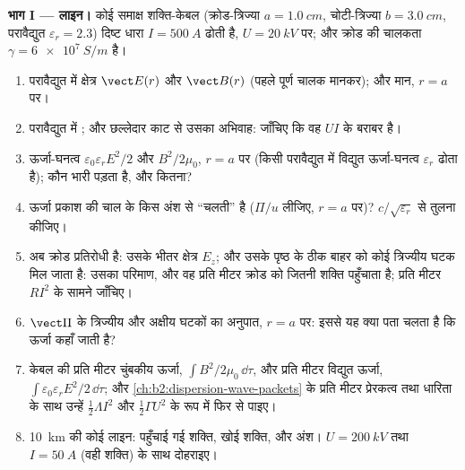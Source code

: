 \begin{problem}[{सप्ताहांत समस्या --- विद्युत्चुंबकीय ऊर्जा का पीछा:
किसी विद्युत-लाइन से किसी घर तक, सूर्य से किसी सौर पट्ट तक,
और किसी मैग्नेट्रॉन से पानी के किसी प्याले तक}]
\label{pb:b2:poynting-vector:1}

\medskip
\noindent\textbf{भाग I --- लाइन।}
कोई समाक्ष शक्ति-केबल (क्रोड-त्रिज्या $a = \qty{1.0}{cm}$, चोटी-त्रिज्या $b =
\qty{3.0}{cm}$, परावैद्युत $\varepsilon_r = 2.3$) दिष्ट धारा $I =
\qty{500}{A}$ ढोती है, $U = \qty{20}{kV}$ पर; और क्रोड की चालकता $\gamma =
\qty{6e7}{S/m}$ है।
\begin{enumerate}
  \item परावैद्युत में क्षेत्र $\vect E(r)$ और $\vect B(r)$ (पहले पूर्ण
        चालक मानकर); और मान, $r = a$ पर।
  \item परावैद्युत में ; और छल्लेदार काट से उसका अभिवाह:
        जाँचिए कि वह $UI$ के बराबर है।
  \item ऊर्जा-घनत्व $\varepsilon_0\varepsilon_rE^2/2$ और $B^2/2\mu_0$, $r = a$ पर
        (किसी परावैद्युत में विद्युत ऊर्जा-घनत्व $\varepsilon_r$ ढोता है);
        कौन भारी पड़ता है, और कितना?
  \item ऊर्जा प्रकाश की चाल के किस अंश से ``चलती'' है
        ($\Pi/u$ लीजिए, $r = a$ पर)? $c/\sqrt{\varepsilon_r}$ से तुलना कीजिए।
  \item अब क्रोड प्रतिरोधी है: उसके भीतर क्षेत्र $E_z$; और उसके पृष्ठ के
        ठीक बाहर  को कोई त्रिज्यीय
        घटक मिल जाता है: उसका परिमाण, और वह प्रति मीटर क्रोड को जितनी शक्ति
        पहुँचाता है; प्रति मीटर $RI^2$ के सामने जाँचिए।
  \item $\vect\Pi$ के त्रिज्यीय और अक्षीय घटकों का अनुपात, $r =
        a$ पर:
        इससे यह क्या पता चलता है कि ऊर्जा कहाँ जाती है?
  \item केबल की प्रति मीटर चुंबकीय ऊर्जा, $\int B^2/2\mu_0\,\dd\tau$, और
        प्रति मीटर विद्युत ऊर्जा, $\int\varepsilon_0\varepsilon_rE^2/2\,\dd\tau$;
        और \cref{ch:b2:dispersion-wave-packets} के प्रति मीटर प्रेरकत्व तथा
        धारिता के साथ उन्हें $\tfrac12\Lambda I^2$ और $\tfrac12\Gamma U^2$ के रूप में फिर से पाइए।
  \item \qty{10}{km} की कोई लाइन: पहुँचाई गई शक्ति, खोई शक्ति, और अंश।
        $U = \qty{200}{kV}$ तथा $I = \qty{50}{A}$ (वही शक्ति) के साथ दोहराइए।
\end{enumerate}


\end{problem}
